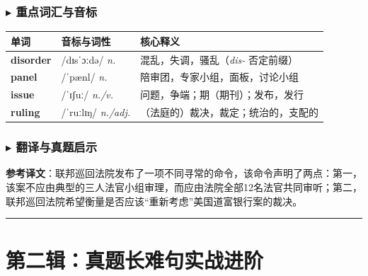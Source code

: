 \documentclass[cn,normal,11pt]{elegantnote}
\newcommand{\retrokey}[1]{{\color{accentcolor}\textbf{#1}}}
\renewcommand{\citshape}{\kaishu\fontspec{Arial}}
\begin{document}
\subsubsection*{$\blacktriangleright$ 重点词汇与音标}
\noindent
\begin{tabularx}{\textwidth}{l X p{7cm}}
  \toprule
  \textbf{单词} & \textbf{音标与词性} & \textbf{核心释义} \\
  \midrule
  \retrokey{disorder} & {\citshape /dɪsˈɔːdə/} \textit{n.} & 混乱，失调，骚乱（\textit{dis-} 否定前缀） \\
  \midrule
  \retrokey{panel} & {\citshape /ˈpænl/} \textit{n.} & 陪审团，专家小组，面板，讨论小组 \\
  \midrule
  \retrokey{issue} & {\citshape /ˈɪʃuː/} \textit{n./v.} & 问题，争端；期（期刊）；发布，发行 \\
  \midrule
  \retrokey{ruling} & {\citshape /ˈruːlɪŋ/} \textit{n./adj.} & （法庭的）裁决，裁定；统治的，支配的 \\
  \bottomrule
\end{tabularx}

\subsubsection*{$\blacktriangleright$ 翻译与真题启示}
\begin{remark}
  \textbf{参考译文}：联邦巡回法院发布了一项不同寻常的命令，该命令声明了两点：第一，该案不应由典型的三人法官小组审理，而应由法院全部12名法官共同审听；第二，联邦巡回法院希望衡量是否应该“重新考虑”美国道富银行案的裁决。
\end{remark}

\par\vspace{10pt}\hrule\vspace{15pt}

\section{第二辑：真题长难句实战进阶}
\end{document}
